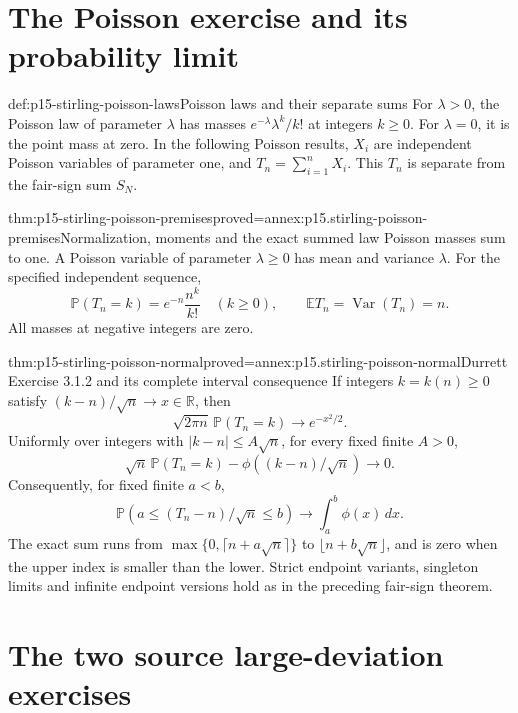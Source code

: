 \section{The Poisson exercise and its probability limit}
\label{sec:p15-stirling-poisson}

\begin{hbdefinition}{def:p15-stirling-poisson-laws}{Poisson laws and their separate sums}
For \(\lambda>0\), the Poisson law of parameter \(\lambda\)
has masses \(e^{-\lambda}\lambda^k/k!\) at integers \(k\geq0\).
For \(\lambda=0\), it is the point mass at zero.
In the following Poisson results, \(X_i\) are independent
Poisson variables of parameter one, and
\(T_n=\sum_{i=1}^nX_i\). This \(T_n\) is separate from the
fair-sign sum \(S_N\).
\end{hbdefinition}

\begin{hblemma}{thm:p15-stirling-poisson-premises}{proved=annex:p15.stirling-poisson-premises}{Normalization, moments and the exact summed law}
Poisson masses sum to one. A Poisson variable of parameter
\(\lambda\geq0\) has mean and variance \(\lambda\).
For the specified independent sequence,
\[
 \mathbb P(T_n=k)=e^{-n}\frac{n^k}{k!}\quad(k\geq0),\qquad
 \mathbb ET_n=\operatorname{Var}(T_n)=n.
\]
All masses at negative integers are zero.
\end{hblemma}

\begin{hbtheorem}{thm:p15-stirling-poisson-normal}{proved=annex:p15.stirling-poisson-normal}{Durrett Exercise 3.1.2 and its complete interval consequence}
If integers \(k=k(n)\geq0\) satisfy
\((k-n)/\sqrt n\to x\in\mathbb R\), then
\[
 \sqrt{2\pi n}\,\mathbb P(T_n=k)\longrightarrow e^{-x^2/2}.
\]
Uniformly over integers with \(|k-n|\leq A\sqrt n\), for
every fixed finite \(A>0\),
\[
 \sqrt n\,\mathbb P(T_n=k)
                  -\phi((k-n)/\sqrt n)\longrightarrow0.
\]
Consequently, for fixed finite \(a<b\),
\[
 \mathbb P(a\leq(T_n-n)/\sqrt n\leq b)
            \longrightarrow\int_a^b\phi(x)\,dx.
\]
The exact sum runs from
\(\max\{0,\lceil n+a\sqrt n\rceil\}\) to
\(\lfloor n+b\sqrt n\rfloor\), and is zero when the upper
index is smaller than the lower.
Strict endpoint variants, singleton limits and infinite endpoint
versions hold as in the preceding fair-sign theorem.
\end{hbtheorem}

\section{The two source large-deviation exercises}
\label{sec:p15-stirling-tail-rates}

